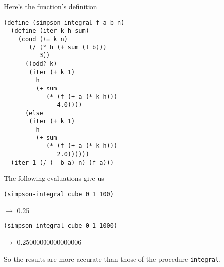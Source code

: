 \documentclass[a4paper,12pt]{article}
\begin{document}
Here's the function's definition
\begin{lstlisting}
(define (simpson-integral f a b n)
  (define (iter k h sum)
    (cond ((= k n)
	   (/ (* h (+ sum (f b)))
	      3))
	  ((odd? k)
	   (iter (+ k 1)
		 h
		 (+ sum
		    (* (f (+ a (* k h)))
		       4.0))))
	  (else
	   (iter (+ k 1)
		 h
		 (+ sum
		    (* (f (+ a (* k h)))
		       2.0))))))
  (iter 1 (/ (- b a) n) (f a)))
\end{lstlisting}
The following evaluations give us
\begin{lstlisting}
(simpson-integral cube 0 1 100)
\end{lstlisting}
$\rightarrow$ 0.25
\begin{lstlisting}
(simpson-integral cube 0 1 1000)
\end{lstlisting}
$\rightarrow$ 0.25000000000000006

So the results are more accurate than those of the procedure
\lstinline!integral!.
\end{document}
